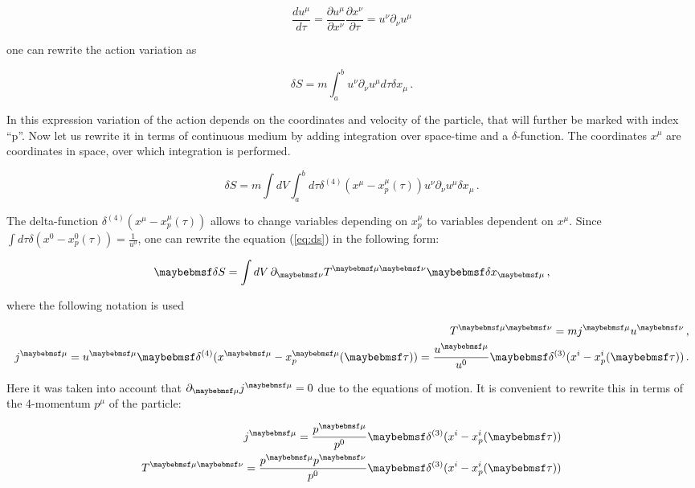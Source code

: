 \begin{equation}
  \frac{du^{\mu}}{d\tau} = \frac{\partial u^{\mu}}{\partial x^{\nu}} \frac{\partial x^{\nu}}{\partial \tau}
   = u^{\nu} \partial_{\nu} u^{\mu}
\end{equation}

one can rewrite the action variation as

\begin{equation}
  \delta S = m \int_a^b u^{\nu} \partial_{\nu} u^{\mu} d\tau \delta x_{\mu} \,.
\end{equation}

In this expression variation of the action depends on the coordinates and velocity
of the particle, that will further be marked with index ``p''. Now let us rewrite
it in terms of continuous medium by adding integration over space-time and a $\delta$-function. The coordinates $x^{\mu}$ are coordinates in
space, over which integration is performed.

\begin{equation} \label{eq:ds}
  \delta S = m \int dV \int_a^b d\tau \delta^{(4)}(x^{\mu} - x^{\mu}_p(\tau)) u^{\nu} \partial_{\nu} u^{\mu} \delta x_{\mu} \,.
\end{equation}

The delta-function $\delta^{(4)}(x^{\mu} - x^{\mu}_p(\tau))$ allows to change
variables depending on $x^{\mu}_p$ to variables dependent on $x^{\mu}$. Since
$\int d\tau \delta(x^{0} - x^{0}_p(\tau)) = \frac{1}{u^{0}}$,
one can rewrite the equation (\ref{eq:ds}) in the following form:

\begin{align}
  \delta S = \int dV \, \partial_{\nu} \Tmn \delta x_{\mu}   \,,
\end{align}

where the following notation is used

\begin{align}
  \Tmn = m \jmu u^{\nu} \,, \\
  \jmu = u^{\mu} \delta^{(4)}(x^{\mu} - x^{\mu}_p(\tau)) = \frac{u^{\mu}}{u^{0}} \delta^{(3)}(x^{i} - x^{i}_p(\tau)) \,.
\end{align}

Here it was taken into account that $\partial_{\mu} \jmu = 0$ due to the
equations of motion. It is convenient to rewrite this in terms of the
4-momentum $p^{\mu}$ of the particle:

\begin{align} \label{eq:tmn_pointlike}
  \jmu = \frac{p^{\mu}}{p^0} \delta^{(3)}(x^i - x^i_p(\tau)) \\
  \Tmn = \frac{p^{\mu}p^{\nu}}{p^0} \delta^{(3)}(x^i - x^i_p(\tau))
\end{align}

